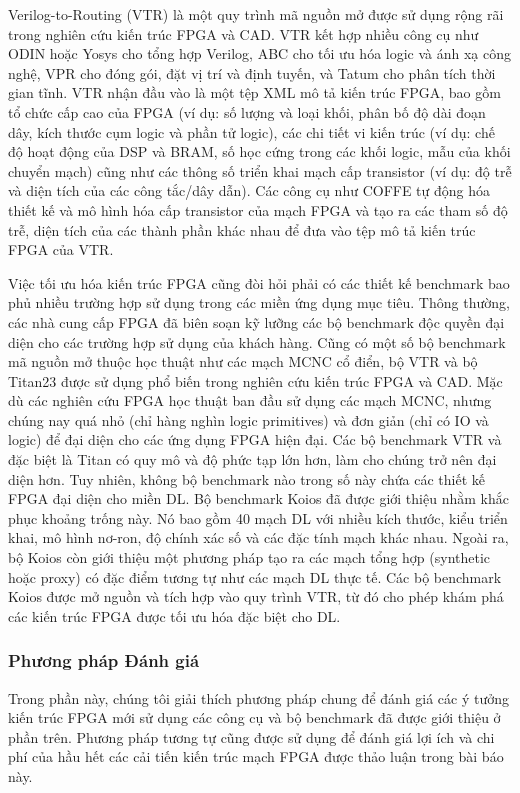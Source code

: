 \documentclass[a4paper]{article}
\begin{document}
Verilog-to-Routing (VTR) là một quy trình mã nguồn mở được sử dụng rộng rãi trong nghiên cứu kiến trúc FPGA và CAD. VTR kết hợp nhiều công cụ như ODIN hoặc Yosys cho tổng hợp Verilog, ABC cho tối ưu hóa logic và ánh xạ công nghệ, VPR cho đóng gói, đặt vị trí và định tuyến, và Tatum cho phân tích thời gian tĩnh. VTR nhận đầu vào là một tệp XML mô tả kiến trúc FPGA, bao gồm tổ chức cấp cao của FPGA (ví dụ: số lượng và loại khối, phân bố độ dài đoạn dây, kích thước cụm logic và phần tử logic), các chi tiết vi kiến trúc (ví dụ: chế độ hoạt động của DSP và BRAM, số học cứng trong các khối logic, mẫu của khối chuyển mạch) cũng như các thông số triển khai mạch cấp transistor (ví dụ: độ trễ và diện tích của các công tắc/dây dẫn). Các công cụ như COFFE tự động hóa thiết kế và mô hình hóa cấp transistor của mạch FPGA và tạo ra các tham số độ trễ, diện tích của các thành phần khác nhau để đưa vào tệp mô tả kiến trúc FPGA của VTR.

Việc tối ưu hóa kiến trúc FPGA cũng đòi hỏi phải có các thiết kế benchmark bao phủ nhiều trường hợp sử dụng trong các miền ứng dụng mục tiêu. Thông thường, các nhà cung cấp FPGA đã biên soạn kỹ lưỡng các bộ benchmark độc quyền đại diện cho các trường hợp sử dụng của khách hàng. Cũng có một số bộ benchmark mã nguồn mở thuộc học thuật như các mạch MCNC cổ điển, bộ VTR và bộ Titan23 được sử dụng phổ biến trong nghiên cứu kiến trúc FPGA và CAD. Mặc dù các nghiên cứu FPGA học thuật ban đầu sử dụng các mạch MCNC, nhưng chúng nay quá nhỏ (chỉ hàng nghìn logic primitives) và đơn giản (chỉ có IO và logic) để đại diện cho các ứng dụng FPGA hiện đại. Các bộ benchmark VTR và đặc biệt là Titan có quy mô và độ phức tạp lớn hơn, làm cho chúng trở nên đại diện hơn. Tuy nhiên, không bộ benchmark nào trong số này chứa các thiết kế FPGA đại diện cho miền DL. Bộ benchmark Koios đã được giới thiệu nhằm khắc phục khoảng trống này. Nó bao gồm 40 mạch DL với nhiều kích thước, kiểu triển khai, mô hình nơ-ron, độ chính xác số và các đặc tính mạch khác nhau. Ngoài ra, bộ Koios còn giới thiệu một phương pháp tạo ra các mạch tổng hợp (synthetic hoặc proxy) có đặc điểm tương tự như các mạch DL thực tế. Các bộ benchmark Koios được mở nguồn và tích hợp vào quy trình VTR, từ đó cho phép khám phá các kiến trúc FPGA được tối ưu hóa đặc biệt cho DL.

\subsubsection{Phương pháp Đánh giá} 
Trong phần này, chúng tôi giải thích phương pháp chung để đánh giá các ý tưởng kiến trúc FPGA mới sử dụng các công cụ và bộ benchmark đã được giới thiệu ở phần trên. Phương pháp tương tự cũng được sử dụng để đánh giá lợi ích và chi phí của hầu hết các cải tiến kiến trúc mạch FPGA được thảo luận trong bài báo này.
\end{document}
